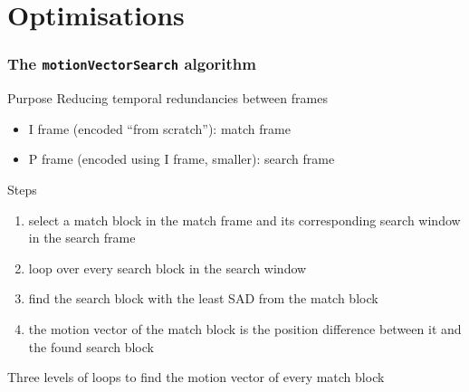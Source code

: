 \section{Optimisations}

\begin{frame}
  \frametitle{The \lstinline{motionVectorSearch} algorithm}
  \begin{block}{Purpose}
    Reducing temporal redundancies between frames
    \onslide<+->
    \begin{itemize}
    \item<+-> I frame (encoded ``from scratch''): \alert{match frame}
    \item<+-> P frame (encoded using I frame, smaller): \alert{search
        frame}
    \end{itemize}
  \end{block}
  \onslide<+->
  \begin{exampleblock}{Steps}
    \begin{enumerate}
    \item<+-> select a \alert{match block} in the \alert{match
        frame} and its corresponding \alert{search window} in the
      \alert{search frame}
    \item<+-> loop over every \alert{search block} in the
      \alert{search window}
    \item<+-> find the \alert{search block} with the least \alert{SAD}
      from the \alert{match block}
    \item<+-> the \alert{motion vector} of the \alert{match block} is
      the position difference between it and the found \alert{search
        block}
    \end{enumerate}
  \end{exampleblock}
  \onslide<+->
  Three levels of loops to find the motion vector of every match
  block
\end{frame}

